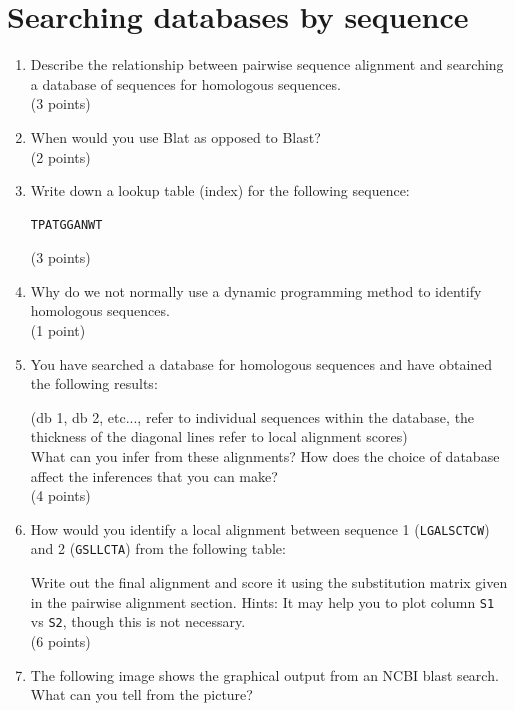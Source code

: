 \documentclass[11pt]{article}
\begin{document}
\section{Searching databases by sequence}
\begin{enumerate}
\item Describe the relationship between pairwise sequence alignment and
  searching a database of sequences for homologous sequences.\\
  (3 points)
\item When would you use Blat as opposed to Blast?\\
  (2 points)
\item Write down a lookup table (index) for the following sequence:
\begin{verbatim}
TPATGGANWT
\end{verbatim}
 (3 points)
\item Why do we not normally use a dynamic programming method to identify
  homologous sequences.\\
  (1 point)
\item You have searched a database for homologous sequences and have obtained
  the following results:
\begin{figure}[H]
  
\end{figure}
{\small(db 1, db 2, etc..., refer to individual sequences within the database, the
thickness of the diagonal lines refer to local alignment scores)}\\
What can you infer from these alignments? How does the choice of database
affect the inferences that you can make?\\
(4 points)
\item How would you identify a local alignment between sequence 1 (\verb|LGALSCTCW|) 
  and 2 (\verb|GSLLCTA|) from the following table:
\begin{figure}[H]
  
\end{figure}
Write out the final alignment and score it using the substitution matrix
given in the pairwise alignment section.
{\small Hints: It may help you to plot column \texttt{S1} vs
  \texttt{S2}, though this is not necessary.
}\\
(6 points)
\item The following image shows the graphical output from an NCBI blast
  search. What can you tell from the picture?
  \begin{figure}[H]

\end{figure}
\end{enumerate}
\end{document}
